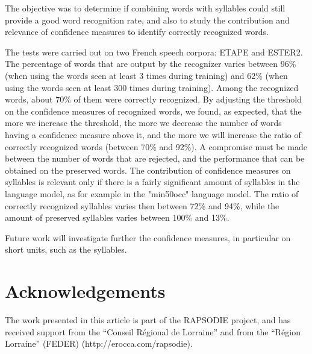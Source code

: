 \documentclass[a4paper]{article}
\begin{document}
The objective was to determine if combining words with syllables could still provide a good word recognition rate, and also to study the contribution and relevance of confidence measures to identify correctly recognized words.

The tests were carried out on two French speech corpora: ETAPE and ESTER2.
The percentage of words that are output by the recognizer varies between 96\% (when using the words seen at least 3 times during training) and 62\% (when using the words seen at least 300 times during training). Among the recognized words, about 70\% of them were correctly recognized.
By adjusting the threshold on the confidence measures of recognized words, we found, as expected, that the more we increase the threshold, the more we decrease the number of words having a confidence measure above it, and the more we will increase the ratio of correctly recognized words (between 70\% and 92\%). A compromise must be made between the number of words that are rejected, and the performance that can be obtained on the preserved words.
The contribution of confidence measures on syllables is relevant only if there is a fairly significant amount of syllables in the language model, as for example in the "min50occ" language model. The ratio of correctly recognized syllables varies then between 72\% and 94\%, while the amount of preserved syllables varies between 100\% and 13\%.

Future work will investigate further the confidence measures, in particular on short units, such as the syllables.

\section{Acknowledgements}
The work presented in this article is part of the RAPSODIE project, and has received
support from the “Conseil Régional de Lorraine” and from the “Région Lorraine” (FEDER) (http://erocca.com/rapsodie).

%
\eightpt


\end{document}

